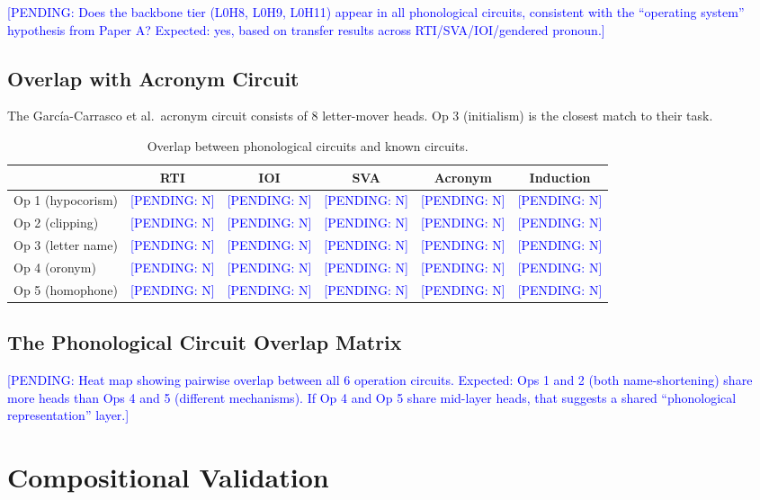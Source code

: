 \documentclass[11pt,a4paper]{article}
\newcommand{\PENDING}[1]{\textcolor{blue}{[PENDING: #1]}}
\begin{document}
\PENDING{Does the backbone tier (L0H8, L0H9, L0H11) appear in all phonological
circuits, consistent with the ``operating system'' hypothesis from Paper A?
Expected: yes, based on transfer results across RTI/SVA/IOI/gendered pronoun.}

\subsection{Overlap with Acronym Circuit}

The Garc\'ia-Carrasco et al.\ acronym circuit consists of 8 letter-mover heads.
Op 3 (initialism) is the closest match to their task.

\begin{table}[h!]
\centering
\caption{Overlap between phonological circuits and known circuits.}
\small
\begin{tabular}{lccccc}
\toprule
& \textbf{RTI} & \textbf{IOI} & \textbf{SVA} & \textbf{Acronym} & \textbf{Induction} \\
\midrule
Op 1 (hypocorism) & \PENDING{N} & \PENDING{N} & \PENDING{N} & \PENDING{N} & \PENDING{N} \\
Op 2 (clipping)   & \PENDING{N} & \PENDING{N} & \PENDING{N} & \PENDING{N} & \PENDING{N} \\
Op 3 (letter name)& \PENDING{N} & \PENDING{N} & \PENDING{N} & \PENDING{N} & \PENDING{N} \\
Op 4 (oronym)     & \PENDING{N} & \PENDING{N} & \PENDING{N} & \PENDING{N} & \PENDING{N} \\
Op 5 (homophone)  & \PENDING{N} & \PENDING{N} & \PENDING{N} & \PENDING{N} & \PENDING{N} \\
\bottomrule
\end{tabular}
\end{table}

\subsection{The Phonological Circuit Overlap Matrix}

\PENDING{Heat map showing pairwise overlap between all 6 operation circuits.
Expected: Ops 1 and 2 (both name-shortening) share more heads than Ops 4 and 5
(different mechanisms). If Op 4 and Op 5 share mid-layer heads, that suggests
a shared ``phonological representation'' layer.}

\section{Compositional Validation}
\end{document}
